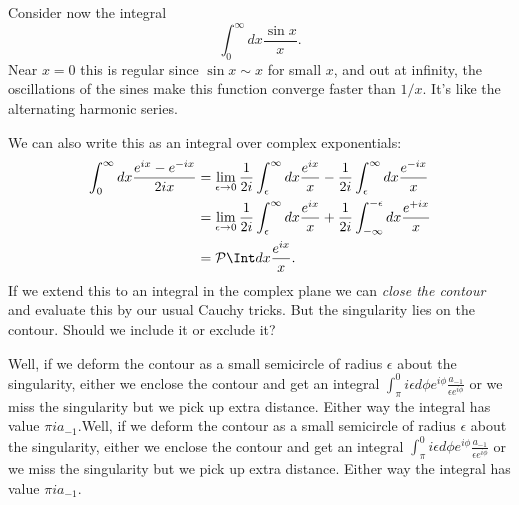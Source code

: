 Consider now the integral
\begin{equation}
    \int_0^\infty dx \frac{\sin x}{x}.
\end{equation}
Near $x=0$ this is regular since $\sin x\sim x$ for small $x$, and out at infinity, the oscillations of the sines make this function converge faster than $1/x$. It's like the alternating harmonic series.

We can also write this as an integral over complex exponentials:
\begin{align*}
    \int_0^\infty dx \frac{e^{ix}-e^{-ix}}{2ix} &= \lim_{\epsilon \to 0}\frac{1}{2i} \int_\epsilon^\infty dx \frac{e^{ix}}{x} - \frac{1}{2i} \int_\epsilon^\infty dx \frac{e^{-ix}}{x}\\
        &= \lim_{\epsilon\to 0} \frac{1}{2i} \int_\epsilon^\infty dx \frac{e^{ix}}{x} + \frac{1}{2i} \int_{-\infty}^{-\epsilon} dx \frac{e^{+ix}}{x}\\
        &= \mathcal{P} \Int dx \frac{e^{ix}}{x}.
\end{align*}
If we extend this to an integral in the complex plane we can \emph{close the contour} and evaluate this by our usual Cauchy tricks. But the singularity lies on the contour. Should we include it or exclude it?

Well, if we deform the contour as a small semicircle of radius $\epsilon$ about the singularity, either we enclose the contour and get an integral $\int_\pi^0 i \epsilon d\phi e^{i\phi} \frac{a_{-1}}{\epsilon e^{i\phi}}$ or we miss the singularity but we pick up extra distance. Either way the integral has value $\pi i a_{-1}.$Well, if we deform the contour as a small semicircle of radius $\epsilon$ about the singularity, either we enclose the contour and get an integral $\int_\pi^0 i \epsilon d\phi e^{i\phi} \frac{a_{-1}}{\epsilon e^{i\phi}}$ or we miss the singularity but we pick up extra distance. Either way the integral has value $\pi i a_{-1}.$

